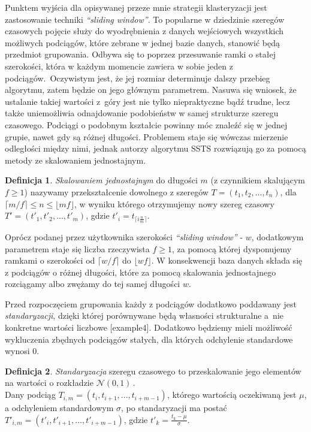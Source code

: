 \documentclass{article}
\theoremstyle{definition}
\newtheorem{defn}{Definicja}
\begin{document}
Punktem wyjścia dla opisywanej przeze mnie strategii klasteryzacji jest zastosowanie techniki \textit{``sliding window''}. 
To popularne w dziedzinie szeregów czasowych pojęcie służy do wyodrębnienia z danych wejściowych wszystkich 
możliwych podciągów, które zebrane w jednej bazie danych, stanowić będą przedmiot grupowania. Odbywa się to poprzez
przesuwanie ramki o stałej szerokości, która w każdym momencie zawiera w sobie jeden z podciągów.~Oczywistym jest, że
jej rozmiar determinuje dalszy przebieg algorytmu, zatem będzie on jego głównym parametrem.  
Nasuwa się wniosek, że ustalanie takiej wartości z~góry jest nie tylko niepraktyczne bądź trudne, lecz także uniemożliwia
odnajdowanie podobieństw w samej strukturze szeregu czasowego. Podciągi o podobnym kształcie powinny móc znaleźć się w
jednej grupie, nawet gdy są różnej długości. Problemem staje się wówczas mierzenie odległości między nimi,
jednak autorzy algorytmu SSTS rozwiązują go za pomocą metody ze skalowaniem jednostajnym.

\begin{defn}
\textit{Skalowaniem jednostajnym} do długości $m$ (z czynnikiem skalującym $f \geqslant 1$) nazywamy przekształcenie
dowolnego z szeregów $T=(t_{1},t_{2},..., t_{n})$, dla $\lceil m/f \rceil \leqslant n \leqslant \lfloor mf \rfloor$, w wyniku którego
otrzymujemy nowy szereg czasowy $T'=(t'_{1}, t'_{2},..., t'_{m})$, gdzie $t'_{i} = t_{\lceil i \frac{n}{m} \rceil} $.
\end{defn}

Oprócz podanej przez użytkownika szerokości  \textit{``sliding window''} - $w$, dodatkowym parametrem staje się liczba rzeczywista $f \geqslant 1$, 
za pomocą której dysponujemy ramkami o szerokości od $\lceil w/f \rceil$ do $\lfloor wf \rfloor$. W konsekwencji baza danych składa się
z podciągów o różnej długości, które za pomocą skalowania jednostajnego rozciągamy albo zwężamy do tej samej długości $w$.

Przed rozpoczęciem grupowania każdy z podciągów dodatkowo poddawany jest \textit{standaryzacji}, dzięki której porównywane będą własności 
strukturalne a~nie konkretne wartości liczbowe [example4]. Dodatkowo będziemy mieli możliwość wykluczenia zbędnych podciągów stałych, dla 
których odchylenie standardowe wynosi $0$.

\begin{defn}
\textit{Standaryzacja} szeregu czasowego to przeskalowanie jego elementów na wartości
o rozkładzie $\mathcal{N}(0, 1)\,$.
\\ Dany podciąg $T_{i,m} = (t_{i}, t_{i+1}, ..., t_{i+m-1})$, którego wartością oczekiwaną jest $\mu$, a odchyleniem standardowym $\sigma$, po standaryzacji ma postać \\$T'_{i,m} = (t'_{i}, t'_{i+1}, ..., t'_{i+m-1})$, gdzie $t'_{k} = \frac{t_{k}-\mu}{\sigma}$.
\end{defn}
\end{document}
